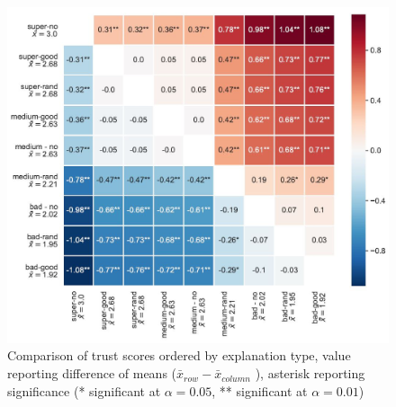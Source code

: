 \begin{figure}[H]
{\begin{minipage}[t]{0.65\textwidth}
			\includegraphics[width=\textwidth]{img/results_matrix_trust_reordered3.JPG}
			\caption{Comparison of trust scores ordered by explanation type, value reporting difference of means ($\bar{x}_{row} - \bar{x}_{column}$ ), asterisk reporting significance (* significant at $\alpha=0.05$, ** significant at $\alpha=0.01$)}
	\end{minipage}}
\end{figure}
\vspace{-5mm}
